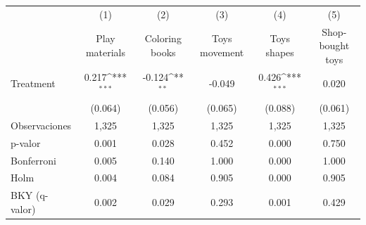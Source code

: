 {
\def\sym#1{\ifmmode^{#1}\else\(^{#1}\)\fi}
\begin{tabular}{l*{5}{c}}
\toprule
                    &\multicolumn{1}{c}{(1)}&\multicolumn{1}{c}{(2)}&\multicolumn{1}{c}{(3)}&\multicolumn{1}{c}{(4)}&\multicolumn{1}{c}{(5)}\\
                    &\multicolumn{1}{c}{Play materials}&\multicolumn{1}{c}{Coloring books}&\multicolumn{1}{c}{Toys movement}&\multicolumn{1}{c}{Toys shapes}&\multicolumn{1}{c}{Shop-bought toys}\\
\midrule
Treatment           &       0.217\sym{***}&      -0.124\sym{**} &      -0.049         &       0.426\sym{***}&       0.020         \\
                    &     (0.064)         &     (0.056)         &     (0.065)         &     (0.088)         &     (0.061)         \\
\midrule
Observaciones       &       1,325         &       1,325         &       1,325         &       1,325         &       1,325         \\
p-valor             &       0.001         &       0.028         &       0.452         &       0.000         &       0.750         \\
Bonferroni          &       0.005         &       0.140         &       1.000         &       0.000         &       1.000         \\
Holm                &       0.004         &       0.084         &       0.905         &       0.000         &       0.905         \\
BKY (q-valor)       &       0.002         &       0.029         &       0.293         &       0.001         &       0.429         \\
\bottomrule
\end{tabular}
}
